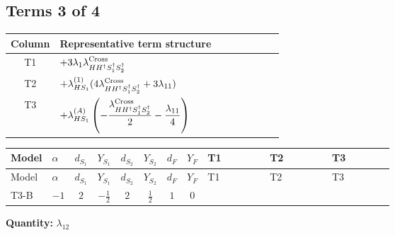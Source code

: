 \documentclass[8pt]{article}
\begin{document}
\begin{landscape}
\subsection*{Terms 3 of 4}
\begin{center}
\begin{tabular}{@{}c >{\raggedright\arraybackslash}p{0.82\linewidth}@{}}
\toprule
Column & Representative term structure \\
\midrule
T1 & \(\displaystyle +3 {\lambda_1} {\lambda_{H H^\dagger S_1^\dagger S_2^\dagger}^{\rm Cross}}\) \\
\midrule
T2 & \(\displaystyle +{\lambda_{HS_1}^{(1)}} (4 {\lambda_{H H^\dagger S_1^\dagger S_2^\dagger}^{\rm Cross}}+3 {\lambda_{11}})\) \\
\midrule
T3 & \(\displaystyle +{\lambda_{HS_1}^{(A)}} \left(-\frac{{\lambda_{H H^\dagger S_1^\dagger S_2^\dagger}^{\rm Cross}}}{2}-\frac{{\lambda_{11}}}{4}\right)\) \\
\midrule
\bottomrule
\end{tabular}
\end{center}
\smallskip
\tiny
\begin{longtable}{@{}llcccccc >{\raggedright\arraybackslash}p{0.21\linewidth} >{\raggedright\arraybackslash}p{0.21\linewidth} >{\raggedright\arraybackslash}p{0.21\linewidth}@{}}
\toprule
Model & $\alpha$ & $d_{S_1}$ & $Y_{S_1}$ & $d_{S_2}$ & $Y_{S_2}$ & $d_F$ & $Y_F$ & T1 & T2 & T3 \\
\midrule
\endfirsthead
\toprule
Model & $\alpha$ & $d_{S_1}$ & $Y_{S_1}$ & $d_{S_2}$ & $Y_{S_2}$ & $d_F$ & $Y_F$ & T1 & T2 & T3 \\
\midrule
\endhead
T3-B & $-1$ & $2$ & $-\frac{1}{2}$ & $2$ & $\frac{1}{2}$ & $1$ & $0$ & \scriptsize\adjustbox{max width=\linewidth}{$\begin{gathered} +3 {\lambda_1} {\lambda_{H H^\dagger S_1^\dagger S_2^\dagger}^{\rm Cross}}\end{gathered}$} & \scriptsize\adjustbox{max width=\linewidth}{$\begin{gathered} +{\lambda_{HS_1}^{(1)}} (4 {\lambda_{H H^\dagger S_1^\dagger S_2^\dagger}^{\rm Cross}}+3 {\lambda_{11}})\end{gathered}$} & \scriptsize\adjustbox{max width=\linewidth}{$\begin{gathered} +{\lambda_{HS_1}^{(A)}} \left(-\frac{{\lambda_{H H^\dagger S_1^\dagger S_2^\dagger}^{\rm Cross}}}{2}-\frac{{\lambda_{11}}}{4}\right)\end{gathered}$} \\
\midrule
\bottomrule
\end{longtable}
\clearpage
\noindent\textbf{Quantity: }$\lambda_{12}$\par\smallskip

\end{landscape}
\end{document}
